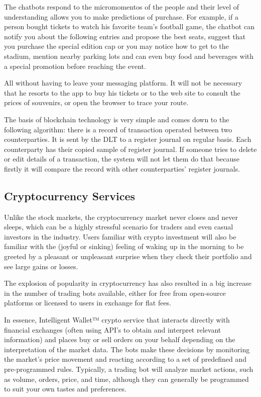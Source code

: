 \documentclass[	DIV=calc,%
							paper=letter,%
							fontsize=12pt%
                            ]{scrartcl}	 					%
\begin{document}
The chatbots respond to the micromomentos of the people and their level of understanding allows you to make predictions of purchase. For example, if a person bought tickets to watch his favorite team's football game, the chatbot can notify you about the following entries and propose the best seats, suggest that you purchase the special edition cap or you may notice how to get to the stadium, mention nearby parking lots and can even buy food and beverages with a special promotion before reaching the event.

All without having to leave your messaging platform. It will not be necessary that he resorts to the app to buy his tickets or to the web site to consult the prices of souvenirs, or open the browser to trace your route.
 
The basis of blockchain technology is very simple and comes down to the following algorithm: there is a record of transaction operated between two counterparties. It is sent by the DLT to a register journal on regular basis. Each counterparty has their copied sample of register journal. If someone tries to delete or edit details of a transaction, the system will not let them do that because firstly it will compare the record with other counterparties’ register journals.

\subsection{\label{sec:level1}Cryptocurrency Services}

Unlike the stock markets, the cryptocurrency market never closes and never sleeps, which can be a highly stressful scenario for traders and even casual investors in the industry. Users familiar with crypto investment will also be familiar with the (joyful or sinking) feeling of waking up in the morning to be greeted by a pleasant or unpleasant surprise when they check their portfolio and see large gains or losses.

The explosion of popularity in cryptocurrency has also resulted in a big increase in the number of trading bots available, either for free from open-source platforms or licensed to users in exchange for flat fees. 

In essence, Intelligent Wallet™ crypto service that interacts directly with financial exchanges (often using API’s to obtain and interpret relevant information) and places buy or sell orders on your behalf depending on the interpretation of the market data. The bots make these decisions by monitoring the market’s price movement and reacting according to a set of predefined and pre-programmed rules. Typically, a trading bot will analyze market actions, such as volume, orders, price, and time, although they can generally be programmed to suit your own tastes and preferences. 
\end{document}

